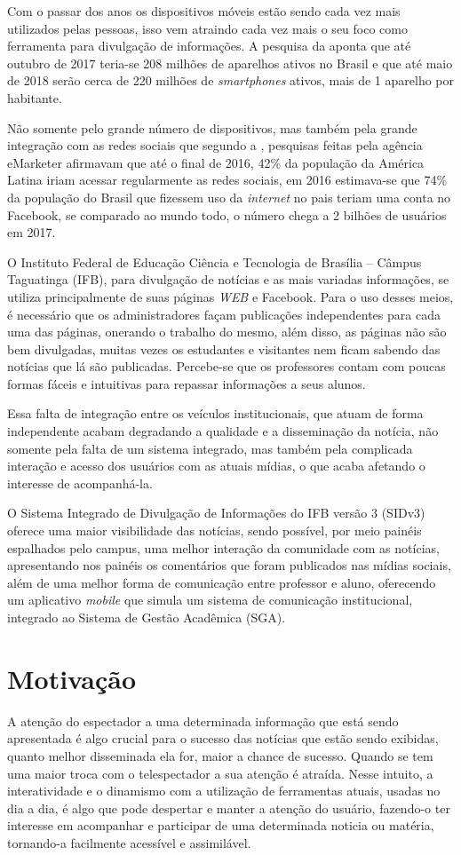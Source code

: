 Com o passar dos anos os dispositivos móveis estão sendo cada vez mais utilizados pelas pessoas, isso vem atraindo cada vez mais o seu foco como ferramenta para divulgação de informações. A pesquisa da \cite{fgv2017} aponta que até outubro de 2017 teria-se 208 milhões de aparelhos ativos no Brasil e que até maio de 2018 serão cerca de 220 milhões de \textit{smartphones} ativos, mais de 1 aparelho por habitante. 

Não somente pelo grande número de dispositivos, mas também pela grande integração com as redes sociais que segundo a \cite{forbes2016}, pesquisas feitas pela agência eMarketer afirmavam que até o final de 2016, 42\% da população da América Latina iriam acessar regularmente as redes sociais, em 2016 estimava-se que 74\% da população do Brasil que fizessem uso da \textit{internet} no pais teriam uma conta no Facebook, se comparado ao mundo todo, o número chega a 2 bilhões de usuários em 2017. 

O Instituto Federal de Educação Ciência e Tecnologia de Brasília -- Câmpus Taguatinga (IFB), para divulgação de notícias e as mais variadas informações, se utiliza principalmente de suas páginas \textit{WEB} e Facebook. Para o uso desses meios, é necessário que os administradores façam publicações independentes para cada uma das páginas, onerando o trabalho do mesmo, além disso, as páginas não são bem divulgadas, muitas vezes os estudantes e visitantes nem ficam sabendo das notícias que lá são publicadas. Percebe-se que os professores contam com poucas formas fáceis e intuitivas para repassar informações a seus alunos.

Essa falta de integração entre os veículos institucionais, que atuam de forma independente acabam degradando a qualidade e a disseminação da notícia, não somente pela falta de um sistema integrado, mas também pela complicada interação e acesso dos usuários com as atuais mídias, o que acaba afetando o interesse de acompanhá-la.

O Sistema Integrado de Divulgação de Informações do IFB versão 3 (SIDv3) oferece uma maior visibilidade das notícias, sendo possível, por meio painéis espalhados pelo campus, uma melhor interação da comunidade com as notícias, apresentando nos painéis os comentários que foram publicados nas mídias sociais, além de uma melhor forma de comunicação entre professor e aluno, oferecendo um aplicativo \textit{mobile} que simula um sistema de comunicação institucional, integrado ao Sistema de Gestão Acadêmica (SGA).

\section{Motivação}
A atenção do espectador a uma determinada informação que está sendo apresentada é algo crucial para o sucesso das notícias que estão sendo exibidas, quanto melhor disseminada ela for, maior a chance de sucesso. Quando se tem uma maior troca com o telespectador a sua atenção é atraída. Nesse intuito, a interatividade e o dinamismo com a utilização de ferramentas atuais, usadas no dia a dia, é algo que pode despertar e manter a atenção do usuário, fazendo-o ter interesse em acompanhar e participar de uma determinada noticia ou matéria, tornando-a facilmente acessível e assimilável. 

